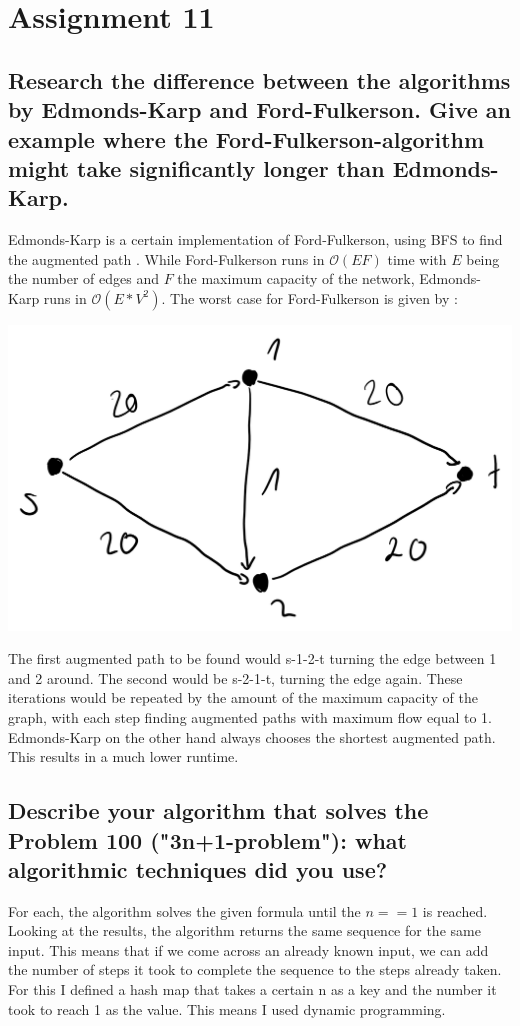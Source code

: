 \documentclass[runningheads]{llncs}
\begin{document}
\section*{Assignment 11}

\subsection*{Research the difference between the algorithms by Edmonds-Karp and Ford-Fulkerson. Give an example where the Ford-Fulkerson-algorithm might take significantly longer than Edmonds-Karp.}
Edmonds-Karp is a certain implementation of Ford-Fulkerson, using BFS to find the augmented path \cite{ref_EK_FF_relation}. While Ford-Fulkerson runs in $\mathcal{O}(EF)$ time with $E$ being the number of edges and $F$ the maximum capacity of the network, Edmonds-Karp runs in $\mathcal{O}(E*V^2)$.
The worst case for Ford-Fulkerson is given by \cite{ref_FF_worst_case}:

\includegraphics[scale=0.5]{./resources/graph_5}

The first augmented path to be found would s-1-2-t turning the edge between 1 and 2 around. The second would be s-2-1-t, turning the edge again. These iterations would be repeated by the amount of the maximum capacity of the graph, with each step finding augmented paths with maximum flow equal to 1.
Edmonds-Karp on the other hand always chooses the shortest augmented path. This results in a much lower runtime.

\subsection*{Describe your algorithm that solves the Problem 100 ("3n+1-problem"): what algorithmic techniques did you use?}
For each, the algorithm solves the given formula until the $n==1$ is reached. Looking at the results, the algorithm returns the same sequence for the same input. This means that if we come across an already known input, we can add the number of steps it took to complete
the sequence to the steps already taken. For this I defined a hash map that takes a certain n as a key and the number it took to reach 1 as the value. This means I used dynamic programming.
\end{document}
